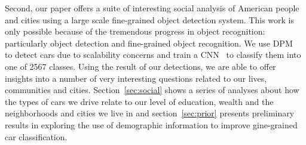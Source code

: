 \documentclass[10pt,twocolumn,letterpaper]{article}
\begin{document}
Second, our paper offers a suite of interesting social analysis of American people and cities using a large scale fine-grained object detection system. This work is only possible because of the tremendous progress in object recognition: particularly object detection and fine-grained object recognition. We use DPM~\cite{dpm} to detect cars due to scalability concerns and train a CNN~\cite{alexnet} to classify them into one of 2567 classes. Using the result of our detections, we are able to offer insights into a number of very interesting questions related to our lives, communities and cities. Section~\ref{sec:social} shows a series of analyses about how the types of cars we drive relate to our level of education, wealth and the neighborhoods and cities we live in and section~\ref{sec:prior} presents preliminary results in exploring the use of demographic information to improve gine-grained car classification.



\end{document}
